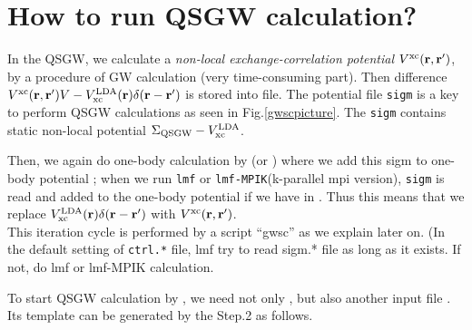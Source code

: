 \section{How to run  QSGW calculation?}

In the QSGW, we calculate a 
{\it non-local exchange-correlation potential} $V^{\rm xc}({\bf r},{\bf r}')$,
by a procedure of GW calculation (very time-consuming part).
Then difference $V^{\rm xc}({\bf r},{\bf r}')V-V_{\rm xc}^{\rm
LDA}({\bf r})\delta({\bf r}-{\bf r}')$  is stored into  file. 
The potential file \verb#sigm# is a key to perform QSGW calculations as seen in
Fig.\ref{gwscpicture}. The \verb#sigm# contains static non-local potential 
$\Sigma_{\rm QSGW}-V_{\rm xc}^{\rm LDA}$. 

Then, we again do one-body calculation by  (or )
where we add this sigm to one-body potential ;
when we run \verb#lmf# or \verb#lmf-MPIK#(k-parallel mpi version),
\verb#sigm# is read and added to the one-body potential 
if we have  in .
Thus this means that
we replace $V_{\rm xc}^{\rm LDA}({\bf r})\delta({\bf r}-{\bf r}')$ 
with $V^{\rm xc}({\bf r},{\bf r}')$.\\

This iteration cycle is performed by a script ``gwsc'' as we
explain later on. (In the default setting of \verb+ctrl.*+ file, lmf try
to read sigm.* file as long as it exists. If not, do lmf or lmf-MPIK calculation.

To start QSGW calculation by ,
we need not only , but also another input file .
Its template  can be generated by the Step.2 as follows.

